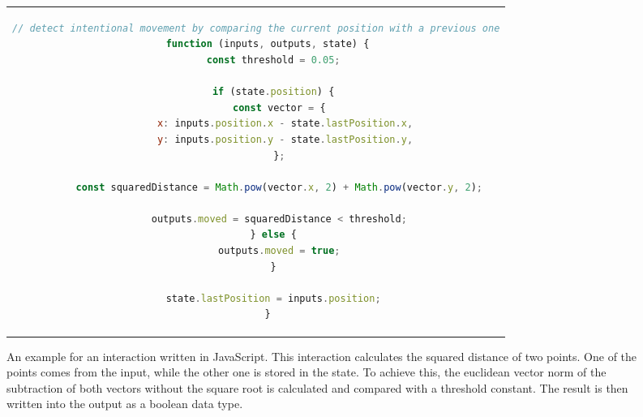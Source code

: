 \begin{figure}[htpb]
  \centering
  \begin{tabular}{c}
  \begin{lstlisting}[language=JavaScript]
    // detect intentional movement by comparing the current position with a previous one
    function (inputs, outputs, state) {
      const threshold = 0.05;

      if (state.position) {
        const vector = {
          x: inputs.position.x - state.lastPosition.x,
          y: inputs.position.y - state.lastPosition.y,
        };
  
        const squaredDistance = Math.pow(vector.x, 2) + Math.pow(vector.y, 2);
  
        outputs.moved = squaredDistance < threshold;
      } else {
        outputs.moved = true;
      }

      state.lastPosition = inputs.position;
    }
  \end{lstlisting}
  \end{tabular}
  \caption[Basic Interaction]{An example for an interaction written in JavaScript. This interaction calculates the squared distance of two points. One of the points comes from the input, while the other one is stored in the state. To achieve this, the euclidean vector norm of the subtraction of both vectors without the square root is calculated and compared with a threshold constant. The result is then written into the output as a boolean data type.}\label{fig:ubii_interaction_example}
\end{figure}

